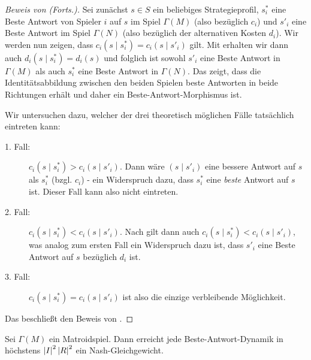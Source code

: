 \begin{proof}[Beweis von  (Forts.)]
	Sei zunächst $s \in S$ ein beliebiges Strategieprofil, $s^\ast_i$ eine Beste Antwort von Spieler $i$ auf $s$ im Spiel $\Gamma(M)$ (also bezüglich $c_i$) und $s'_i$ eine Beste Antwort im Spiel $\Gamma(N)$ (also bezüglich der alternativen Kosten $d_i$). Wir werden nun zeigen, dass $c_i(s \mid s^\ast_i) = c_i(s \mid s'_i)$ gilt. Mit  erhalten wir dann auch $d_i(s \mid s^\ast_i) = d_i(s)$ und folglich ist sowohl $s'_i$ eine Beste Antwort in $\Gamma(M)$ als auch $s^\ast_i$ eine Beste Antwort in $\Gamma(N)$. Das zeigt, dass die Identitätsabbildung zwischen den beiden Spielen beste Antworten in beide Richtungen erhält und daher ein Beste-Antwort-Morphismus ist. 
	
	Wir untersuchen dazu, welcher der drei theoretisch möglichen Fälle tatsächlich eintreten kann:
	\begin{description}
		\item[1. Fall:] $c_i(s \mid s^\ast_i) > c_i(s \mid s'_i)$. Dann wäre $(s \mid s'_i)$ eine bessere Antwort auf $s$ als $s^\ast_i$ (bzgl. $c_i$) - ein Widerspruch dazu, dass $s^\ast_i$ eine \emph{beste} Antwort auf $s$ ist. Dieser Fall kann also nicht eintreten.
		\item[2. Fall:] $c_i(s \mid s^\ast_i) < c_i(s \mid s'_i)$. Nach  gilt dann auch $c_i(s \mid s^\ast_i) < c_i(s \mid s'_i)$, was analog zum ersten Fall ein Widerspruch dazu ist, dass $s'_i$ eine Beste Antwort auf $s$ bezüglich $d_i$ ist.
		\item[3. Fall:] $c_i(s \mid s^\ast_i) = c_i(s \mid s'_i)$ ist also die einzige verbleibende Möglichkeit.
	\end{description}
	Das beschließt den Beweis von .
\end{proof}

\begin{kor}
	Sei $\Gamma(M)$ ein Matroidspiel. Dann erreicht jede Beste-Antwort-Dynamik in höchstens $\left|I\right|^2\left|R\right|^2$ ein Nash-Gleichgewicht.
\end{kor}

